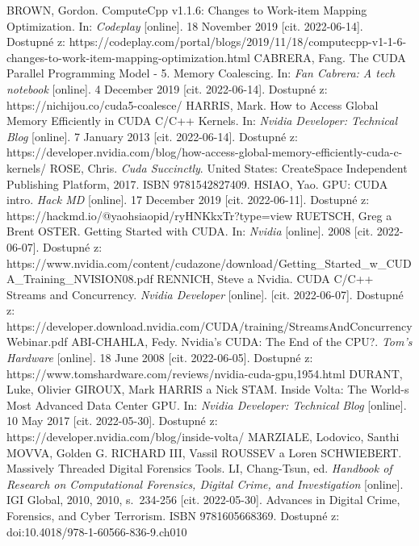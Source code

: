 \begin{thebibliography}{38}
	BROWN, Gordon. ComputeCpp v1.1.6: Changes to Work-item Mapping Optimization. In: \textit{Codeplay} [online]. 18 November 2019 [cit. 2022-06-14]. Dostupné z: https://codeplay.com/portal/blogs/2019/11/18/computecpp-v1-1-6-changes-to-work-item-mapping-optimization.html
	CABRERA, Fang. The CUDA Parallel Programming Model - 5. Memory Coalescing. In: \textit{Fan Cabrera: A tech notebook} [online]. 4 December 2019 [cit. 2022-06-14]. Dostupné z: https://nichijou.co/cuda5-coalesce/
	HARRIS, Mark. How to Access Global Memory Efficiently in CUDA C/C++ Kernels. In: \textit{Nvidia Developer: Technical Blog} [online]. 7 January 2013 [cit. 2022-06-14]. Dostupné z: https://developer.nvidia.com/blog/how-access-global-memory-efficiently-cuda-c-kernels/
	ROSE, Chris. \textit{Cuda Succinctly}. United States: CreateSpace Independent Publishing Platform, 2017. ISBN 9781542827409.
	HSIAO, Yao. GPU: CUDA intro. \textit{Hack MD} [online]. 17 December 2019 [cit. 2022-06-11]. Dostupné z: https://hackmd.io/@yaohsiaopid/ryHNKkxTr?type=view
	RUETSCH, Greg a Brent OSTER. Getting Started with CUDA. In: \textit{Nvidia} [online]. 2008 [cit. 2022-06-07]. Dostupné z: https://www.nvidia.com/content/cudazone/download/Getting\_Started\_w\_CUDA\_Training\_NVISION08.pdf
	RENNICH, Steve a Nvidia. CUDA C/C++ Streams and Concurrency. \textit{Nvidia Developer} [online]. [cit. 2022-06-07]. Dostupné z: https://developer.download.nvidia.com/CUDA/training/StreamsAndConcurrencyWebinar.pdf
	ABI-CHAHLA, Fedy. Nvidia's CUDA: The End of the CPU?. \textit{Tom's Hardware} [online]. 18 June 2008 [cit. 2022-06-05]. Dostupné z: https://www.tomshardware.com/reviews/nvidia-cuda-gpu,1954.html
	DURANT, Luke, Olivier GIROUX, Mark HARRIS a Nick STAM. Inside Volta: The World-s Most Advanced Data Center GPU. In: \textit{Nvidia Developer: Technical Blog} [online]. 10 May 2017 [cit. 2022-05-30]. Dostupné z: https://developer.nvidia.com/blog/inside-volta/
	MARZIALE, Lodovico, Santhi MOVVA, Golden G. RICHARD III, Vassil ROUSSEV a Loren SCHWIEBERT. Massively Threaded Digital Forensics Tools. LI, Chang-Tsun, ed. \textit{Handbook of Research on Computational Forensics, Digital Crime, and Investigation} [online]. IGI Global, 2010, 2010, s.~234-256 [cit. 2022-05-30]. Advances in Digital Crime, Forensics, and Cyber Terrorism. ISBN 9781605668369. Dostupné z: doi:10.4018/978-1-60566-836-9.ch010

\end{thebibliography}
